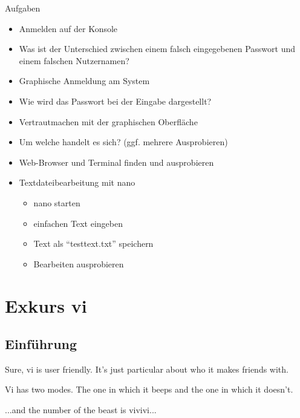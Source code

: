 \documentclass[aspectratio=43]{beamer}
\begin{document}
\begin{frame}{Aufgaben}
  \begin{itemize}
    \item Anmelden auf der Konsole
    \item Was ist der Unterschied zwischen einem falsch eingegebenen Passwort und einem falschen Nutzernamen?
    \item Graphische Anmeldung am System
    \item Wie wird das Passwort bei der Eingabe dargestellt?
    \item Vertrautmachen mit der graphischen Oberfläche
    \item Um welche handelt es sich? (ggf. mehrere Ausprobieren)
    \item Web-Browser und Terminal finden und ausprobieren
    \item Textdateibearbeitung mit nano
    \begin{itemize}
      \item nano starten
      \item einfachen Text eingeben
      \item Text als "`testtext.txt"' speichern
      \item Bearbeiten ausprobieren
    \end{itemize}

  \end{itemize}

\end{frame}


\section{Exkurs vi}
\subsection{Einf\"uhrung}
\begin{frame} 
        \begin{block}{} 
        \begin{center}
        Sure, vi is user friendly. It's just particular about who it makes friends with.
        \end{center}
        \end{block}

        \begin{exampleblock}{} 
        \begin{center}  
        Vi has two modes. The one in which it beeps and the one in which it doesn't.
        \end{center}
        \end{exampleblock}
        \begin{alertblock}{} 
        \begin{center}  
        ...and the number of the beast is vivivi...
        \end{center}
        \end{alertblock}        
\end{frame}
\end{document}
